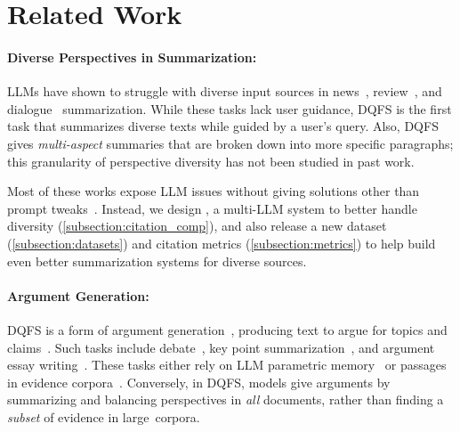 
\section{Related Work}

\paragraph{Diverse Perspectives in Summarization:}

LLMs have shown to struggle with diverse input sources in news~\cite{huang-etal-2024-embrace}, review~\cite{zeng2023scientific}, and dialogue~\cite{zhang-etal-2024-fair} summarization.
While these tasks lack user guidance, DQFS is the first task that summarizes diverse texts while guided by a user's query.
Also, DQFS gives \textit{multi-aspect} summaries that are broken down into more specific paragraphs; this granularity of perspective diversity has not been studied in past work.


Most of these works expose LLM issues without giving solutions other than prompt tweaks~\cite{huang-etal-2024-embrace, zhang-etal-2024-fair}.
Instead, we design \model, a multi-LLM system to better handle diversity (\cref{subsection:citation_comp}), and also release a new dataset (\cref{subsection:datasets}) and citation metrics (\cref{subsection:metrics}) to help build even better summarization systems for diverse sources.

\paragraph{Argument Generation:}

DQFS is a form of argument generation~\cite{zukerman2000using}, producing text to argue for topics and claims~\cite{schiller2020aspect}.
Such tasks include debate~\cite{li2024can, hu2023americano, hu2024unlocking}, key point summarization~\cite{bar2020arguments, li2024exploring}, and argument essay writing~\cite{heinisch2022strategies, bao-etal-2022-aeg}.
These tasks either rely on LLM parametric memory~\cite{li2024can} or passages in evidence corpora~\cite{hua2019argument}. 
Conversely, in DQFS, models give arguments by summarizing and balancing perspectives in \textit{all} documents, rather than finding a \textit{subset} of evidence in large~corpora.

